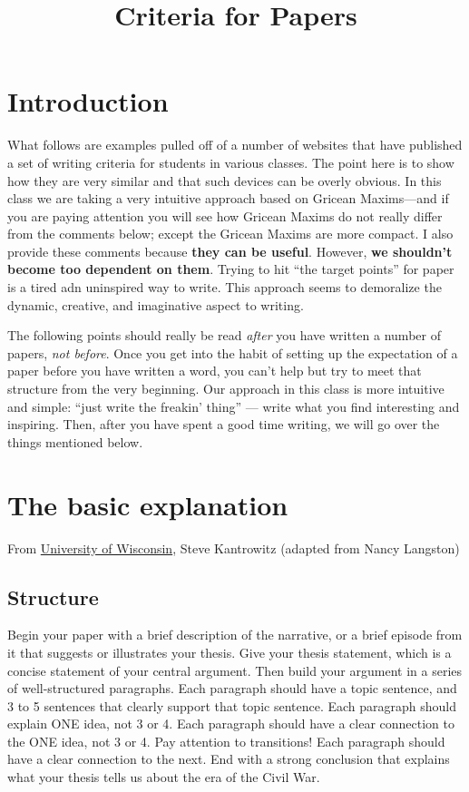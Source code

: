 \documentclass{article}
\begin{document}
\title{Criteria for Papers}
\maketitle
\tableofcontents

\section{Introduction}
What follows are examples pulled off of a number of websites that have published a
set of writing criteria for students in various classes. The point here is to show how they are very similar and that such devices can be overly obvious. In this class we are taking a very intuitive approach based on Gricean Maxims---and if you are paying attention you will see how Gricean Maxims do not really differ from the comments below; except the Gricean Maxims are more compact. I also provide these comments because {\bf they can be useful}. However, {\bf we shouldn't become too dependent on them}. Trying to hit ``the target points'' for paper is a tired adn uninspired way to write. This approach seems to demoralize the dynamic, creative, and imaginative aspect to writing. 

The following points should really be read {\sl after} you have written a number of papers, {\sl not before}. Once you get into the habit of setting up the expectation of a paper before you have written a word, you can't help but try to meet that structure from the very beginning. Our approach in this class is more intuitive and simple: ``just write the freakin' thing'' --- write what you find interesting and inspiring. Then, after you have spent a good time writing, we will go over the things mentioned below.
\section{The basic explanation}
From \href{http://mendota.english.wisc.edu/~WAC/page.jsp?id=101&c_type=article&c_id=4}{University of Wisconsin}, Steve Kantrowitz (adapted from Nancy Langston)
\subsection{Structure}
Begin your paper with a brief description of the narrative, or a brief episode
from it that suggests or illustrates your thesis. Give your thesis statement,
which is a concise statement of your central argument. Then build your argument
in a series of well-structured paragraphs. Each paragraph should have a topic
sentence, and 3 to 5 sentences that clearly support that topic sentence. Each
paragraph should explain ONE idea, not 3 or 4. Each paragraph should have a
clear connection to the ONE idea, not 3 or 4. Pay attention to transitions! Each
paragraph should have a clear connection to the next. End with a strong
conclusion that explains what your thesis tells us about the era of the Civil
War.
\end{document}
